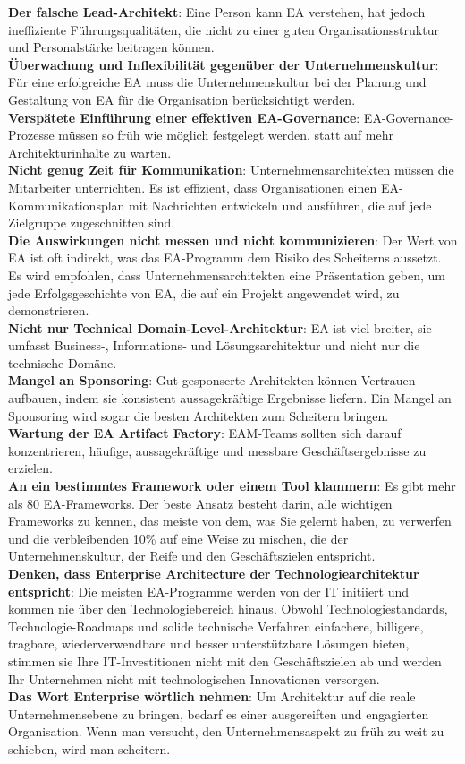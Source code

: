 \documentclass[
	A4paper,
	DIV=9,
	BCOR7mm,
	smallheadings,
	headinclude,
	footinclude,
	headsepline,
	parindent,
	german,
	captions=tableheading,
	abstracton
	]{scrreprt}
\begin{document}
\textbf{Der falsche Lead-Architekt}: Eine Person kann EA verstehen, hat jedoch ineffiziente Führungsqualitäten, die nicht zu einer guten Organisationsstruktur und Personalstärke beitragen können.
\\
\textbf{Überwachung und Inflexibilität gegenüber der Unternehmenskultur}: Für eine erfolgreiche EA muss die Unternehmenskultur bei der Planung und Gestaltung von EA für die Organisation berücksichtigt werden.
\\
\textbf{Verspätete Einführung einer effektiven EA-Governance}: EA-Governance-Prozesse müssen so früh wie möglich festgelegt werden, statt auf mehr Architekturinhalte zu warten.
\\
\textbf{Nicht genug Zeit für Kommunikation}: Unternehmensarchitekten müssen die Mitarbeiter unterrichten. Es ist effizient, dass Organisationen einen EA-Kommunikationsplan mit Nachrichten entwickeln und ausführen, die auf jede Zielgruppe zugeschnitten sind.
\\
\textbf{Die Auswirkungen nicht messen und nicht kommunizieren}: Der Wert von EA ist oft indirekt, was das EA-Programm dem Risiko des Scheiterns aussetzt. Es wird empfohlen, dass Unternehmensarchitekten eine Präsentation geben, um jede Erfolgsgeschichte von EA, die auf ein Projekt angewendet wird, zu demonstrieren.
\\
\textbf{Nicht nur Technical Domain-Level-Architektur}: EA ist viel breiter, sie umfasst Business-, Informations- und Lösungsarchitektur und nicht nur die technische Domäne. \autocite{Ojo2016}
\\
\textbf{Mangel an Sponsoring}: Gut gesponserte Architekten können Vertrauen aufbauen, indem sie konsistent aussagekräftige Ergebnisse liefern. Ein Mangel an Sponsoring wird sogar die besten Architekten zum Scheitern bringen.
\\
\textbf{Wartung der EA Artifact Factory}: EAM-Teams sollten sich darauf konzentrieren, häufige, aussagekräftige und messbare Geschäftsergebnisse zu erzielen.
\\
\textbf{An ein bestimmtes Framework oder einem Tool klammern}: Es gibt mehr als 80 EA-Frameworks. Der beste Ansatz besteht darin, alle wichtigen Frameworks zu kennen, das meiste von dem, was Sie gelernt haben, zu verwerfen und die verbleibenden 10\% auf eine Weise zu mischen, die der Unternehmenskultur, der Reife und den Geschäftszielen entspricht.
\\
\textbf{Denken, dass Enterprise Architecture der Technologiearchitektur entspricht}: Die meisten EA-Programme werden von der IT initiiert und kommen nie über den Technologiebereich hinaus. Obwohl Technologiestandards, Technologie-Roadmaps und solide technische Verfahren einfachere, billigere, tragbare, wiederverwendbare und besser unterstützbare Lösungen bieten, stimmen sie Ihre IT-Investitionen nicht mit den Geschäftszielen ab und werden Ihr Unternehmen nicht mit technologischen Innovationen versorgen.
\\
\textbf{Das Wort Enterprise wörtlich nehmen}: Um Architektur auf die reale Unternehmensebene zu bringen, bedarf es einer ausgereiften und engagierten Organisation. Wenn man versucht, den Unternehmensaspekt zu früh zu weit zu schieben, wird man scheitern.
\end{document}

